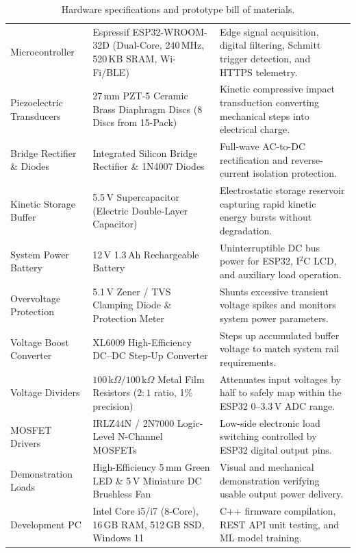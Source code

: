 \begin{table}[H]
\centering
\small
\renewcommand{\arraystretch}{1.25}
\caption{Hardware specifications and prototype bill of materials.}
\label{tab:hardware_resources}
\begin{tabularx}{\textwidth}{@{} L{1.3in} L{2.0in} Y @{}}
\toprule
{}
 &  &  \\
\midrule
{}
Microcontroller & Espressif ESP32-WROOM-32D (Dual-Core, 240\,MHz, 520\,KB SRAM, Wi-Fi/BLE) & Edge signal acquisition, digital filtering, Schmitt trigger detection, and HTTPS telemetry. \\
Piezoelectric Transducers & 27\,mm PZT-5 Ceramic Brass Diaphragm Discs (8 Discs from 15-Pack) & Kinetic compressive impact transduction converting mechanical steps into electrical charge. \\
Bridge Rectifier \& Diodes & Integrated Silicon Bridge Rectifier \& 1N4007 Diodes & Full-wave AC-to-DC rectification and reverse-current isolation protection. \\
Kinetic Storage Buffer & 5.5\,V Supercapacitor (Electric Double-Layer Capacitor) & Electrostatic storage reservoir capturing rapid kinetic energy bursts without degradation. \\
System Power Battery & 12\,V 1.3\,Ah Rechargeable Battery & Uninterruptible DC bus power for ESP32, I$^2$C LCD, and auxiliary load operation. \\
Overvoltage Protection & 5.1\,V Zener / TVS Clamping Diode \& Protection Meter & Shunts excessive transient voltage spikes and monitors system power parameters. \\
Voltage Boost Converter & XL6009 High-Efficiency DC--DC Step-Up Converter & Steps up accumulated buffer voltage to match system rail requirements. \\
Voltage Dividers & $100\,\text{k}\Omega / 100\,\text{k}\Omega$ Metal Film Resistors ($2:1$ ratio, 1\% precision) & Attenuates input voltages by half to safely map within the ESP32 $0\text{--}3.3\,\text{V}$ ADC range. \\
MOSFET Drivers & IRLZ44N / 2N7000 Logic-Level N-Channel MOSFETs & Low-side electronic load switching controlled by ESP32 digital output pins. \\
Demonstration Loads & High-Efficiency 5\,mm Green LED \& 5\,V Miniature DC Brushless Fan & Visual and mechanical demonstration verifying usable output power delivery. \\
Development PC & Intel Core i5/i7 (8-Core), 16\,GB RAM, 512\,GB SSD, Windows 11 & C++ firmware compilation, REST API unit testing, and ML model training. \\
\bottomrule
\end{tabularx}
\end{table}

